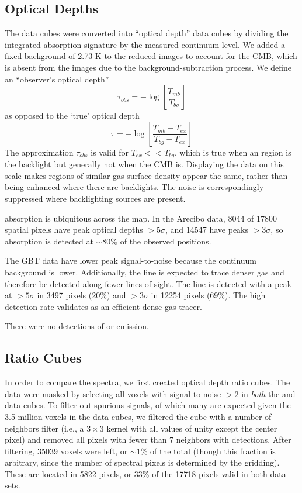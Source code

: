 \subsection{Optical Depths}

The data cubes were converted into ``optical depth'' data cubes by dividing the
integrated \formaldehyde absorption signature by the measured continuum level.
We added a fixed background of 2.73 K to the reduced images to account for the
CMB, which is absent from the images due to the background-subtraction
process.  We define an ``observer's optical depth''
\begin{equation}
    \tau_{obs} = -\log\left[\frac{T_{mb}}{T_{bg}}\right]
\end{equation}
as opposed to the `true' optical depth
\begin{equation}
    \tau = -\log\left[\frac{T_{mb}-T_{ex}}{T_{bg}-T_{ex}}\right]
\end{equation}
The approximation $\tau_{obs}$ is valid for $T_{ex} << T_{bg}$, which is true when an
\hii region is the backlight but generally not when the CMB is.  Displaying the
data on this scale makes regions of similar gas surface density appear the
same, rather than being enhanced where there are backlights.  The noise is
correspondingly suppressed where backlighting sources are present.


\formaldehyde absorption is ubiquitous across the map.  In the Arecibo data,
8044 of 17800 spatial pixels have peak optical depths $>5\sigma$, and 14547
have peaks $>3\sigma$, so \formaldehyde absorption is detected at $\sim80\%$ of
the observed positions.

The GBT \formaldehyde \twotwo data have lower peak signal-to-noise because the
continuum background is lower.  Additionally, the \twotwo line is expected to
trace denser gas and therefore be detected along fewer lines of sight.  The
\twotwo line is detected with a peak at $>5\sigma$ in 3497 pixels (20\%) and
$>3\sigma$ in 12254 pixels (69\%).  The high detection rate validates
\formaldehyde as an efficient dense-gas tracer.

There were no detections of \formaldehyde \oneone or \twotwo emission.

\subsection{Ratio Cubes}
In order to compare the \formaldehyde spectra, we first
created optical depth ratio cubes.  The data were masked by selecting all
voxels with signal-to-noise $>2$ in  \emph{both} the \oneone and \twotwo data
cubes.  To filter out spurious signals, of which many are expected given the
3.5 million voxels in the data cubes, we filtered the cube with a
number-of-neighbors filter (i.e., a $3\times3$ kernel with all values of unity
except the center pixel) and removed all pixels with fewer than 7 neighbors
with detections.  After filtering, 35039 voxels were left, or $\sim 1\%$ of the
total (though this fraction is arbitrary, since the number of spectral pixels
is determined by the gridding).  These are located in 5822 pixels, or 33\% of
the 17718 pixels valid in both data sets.

